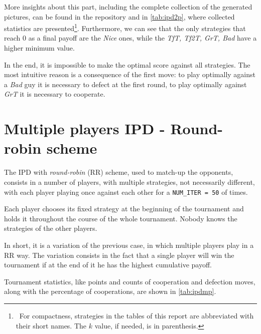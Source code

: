 \documentclass[journal,a4paper,10pt,twoside]{IEEEtran} %
\begin{document}
More insights about this part, including the complete collection of the generated pictures, can be found in the repository and in \autoref{tab:ipd2p}, where collected statistics are presented\footnote{~For compactness, strategies in the tables of this report are abbreviated with their short names. The $k$ value, if needed, is in parenthesis.}. Furthermore, we can see that the only strategies that reach $0$ as a final payoff are the \textit{Nice} ones, while the \textit{TfT, Tf2T, GrT, Bad} have a higher minimum value.

In the end, it is impossible to make the optimal score against all strategies. The most intuitive reason is a consequence of the first move: to play optimally against a \textit{Bad} guy it is necessary to defect at the first round, to play optimally against \textit{GrT} it is necessary to cooperate.~\cite{mathieu2017}

\section{Multiple players IPD - Round-robin scheme} \label{s:IPDMP}
The IPD with \textit{round-robin} (RR) scheme, used to match-up the opponents, consists in a number of players, with multiple strategies, not necessarily different, with each player playing once against each other for a \texttt{NUM\_ITER = 50} of times.

Each player chooses its fixed strategy at the beginning of the tournament and holds it throughout the course of the whole tournament. Nobody knows the strategies of the other players.

In short, it is a variation of the previous case, in which multiple players play in a RR way. The variation consists in the fact that a single player will win the tournament if at the end of it he has the highest cumulative payoff.

Tournament statistics, like points and counts of cooperation and defection moves, along with the percentage of cooperations, are shown in \autoref{tab:ipdmp}.
\end{document}
